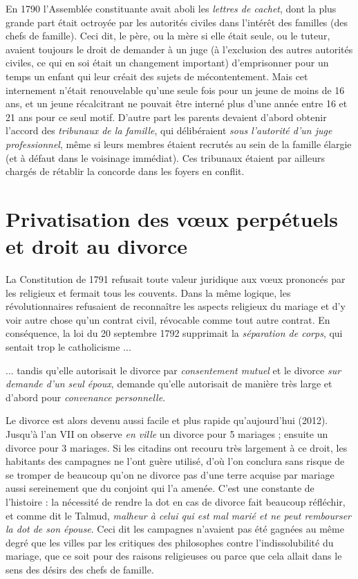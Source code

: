  En 1790 l'Assemblée constituante avait aboli les \emph{lettres de cachet}, dont la plus grande part était octroyée par les autorités civiles dans l'intérêt des familles (des chefs de famille). Ceci dit, le père, ou la mère si elle était seule, ou le tuteur, avaient toujours le droit de demander à un juge (à l'exclusion des autres autorités civiles, ce qui en soi était un changement important) d'emprisonner pour un temps un enfant qui leur créait des sujets de mécontentement. Mais cet internement n'était renouvelable qu'une seule fois pour un jeune de moins de 16 ans, et un jeune récalcitrant ne pouvait être interné plus d'une année entre 16 et 21 ans pour ce seul motif. D'autre part les parents devaient d'abord obtenir l'accord des \emph{tribunaux de la famille}, qui délibéraient \emph{sous l'autorité d'un juge professionnel}, même si leurs membres étaient recrutés au sein de la famille élargie (et à défaut dans le voisinage immédiat). Ces tribunaux étaient par ailleurs chargés de rétablir la concorde dans les foyers en conflit. 


\section{Privatisation des vœux perpétuels et droit au divorce}

 La Constitution de 1791 refusait toute valeur juridique aux vœux prononcés par les religieux et fermait tous les couvents. Dans la même logique, les révolutionnaires refusaient de reconnaître les aspects religieux du mariage et d'y voir autre chose qu'un contrat civil, révocable comme tout autre contrat. En conséquence, la loi du 20 septembre 1792 supprimait la \emph{séparation de corps}, qui sentait trop le catholicisme ...

 ... tandis qu'elle autorisait le divorce par \emph{consentement mutuel} et le divorce \emph{sur demande d'un seul époux}, demande qu'elle autorisait de manière très large et d'abord pour \emph{convenance personnelle}. 

 Le divorce est alors devenu aussi facile et plus rapide qu'aujourd'hui (2012). Jusqu'à l'an VII on observe \emph{en ville} un divorce pour 5 mariages ; ensuite un divorce pour 3 mariages. Si les citadins ont recouru très largement à ce droit, les habitants des campagnes ne l'ont guère utilisé, d'où l'on conclura sans risque de se tromper de beaucoup qu'on ne divorce pas d'une terre acquise par mariage aussi sereinement que du conjoint qui l'a amenée. C'est une constante de l'histoire : la nécessité de rendre la dot en cas de divorce fait beaucoup réfléchir, et comme dit le Talmud, \emph{malheur à celui qui est mal marié et ne peut rembourser la dot de son épouse}. Ceci dit les campagnes n'avaient pas été gagnées au même degré que les villes par les critiques des philosophes contre l'indissolubilité du mariage, que ce soit pour des raisons religieuses ou parce que cela allait dans le sens des désirs des chefs de famille. 

